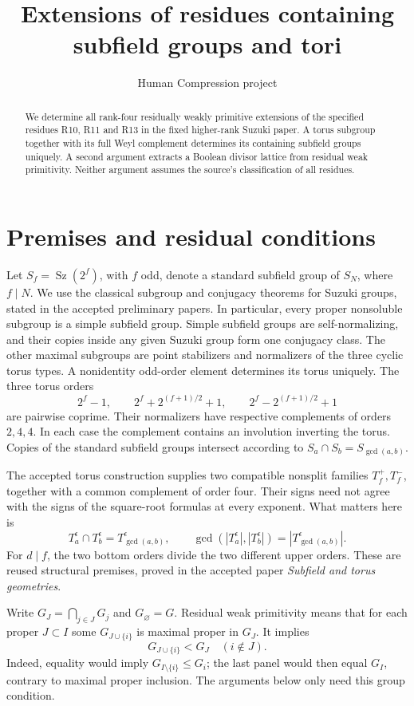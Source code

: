 \documentclass[11pt,a4paper]{article}
\title{Extensions of residues containing subfield groups and tori}
\author{Human Compression project}\date{}
\newcommand{\Sz}{\operatorname{Sz}}\newcommand{\F}{\mathbb F}
\begin{document}
\maketitle
\begin{abstract}
We determine all rank-four residually weakly primitive extensions of
the specified residues R10, R11 and R13 in the fixed higher-rank Suzuki
paper. A torus subgroup together with its full Weyl complement determines
its containing subfield groups uniquely. A second argument extracts a
Boolean divisor lattice from residual weak primitivity. Neither argument
assumes the source's classification of all residues.
\end{abstract}

\section{Premises and residual conditions}
Let $S_f=\Sz(2^f)$, with $f$ odd, denote a standard subfield group of
$S_N$, where $f\mid N$. We use the classical subgroup and conjugacy
theorems for Suzuki groups, stated in the accepted preliminary papers.
In particular, every proper nonsoluble subgroup is a simple subfield
group. Simple subfield groups are self-normalizing, and their copies
inside any given Suzuki group form one conjugacy class. The other
maximal subgroups are point stabilizers and normalizers of the three
cyclic torus types. A nonidentity odd-order element determines its
torus uniquely. The three torus orders
\[
 2^f-1,\qquad 2^f+2^{(f+1)/2}+1,\qquad
 2^f-2^{(f+1)/2}+1
\]
are pairwise coprime. Their normalizers have respective complements
of orders $2,4,4$. In each case the complement contains an involution
inverting the torus. Copies of the standard subfield groups intersect
according to $S_a\cap S_b=S_{\gcd(a,b)}$.

The accepted torus construction supplies two compatible nonsplit
families $T_f^+,T_f^-$, together with a common complement of order four.
Their signs need not agree with the signs of the square-root formulas
at every exponent. What matters here is
\[
 T_a^\epsilon\cap T_b^\epsilon=T_{\gcd(a,b)}^\epsilon,
 \qquad
 \gcd(|T_a^\epsilon|,|T_b^\epsilon|)
       =|T_{\gcd(a,b)}^\epsilon|.                 \tag{1}
\]
For $d\mid f$, the two bottom orders divide the two different upper
orders. These are reused structural premises, proved in the accepted
paper \emph{Subfield and torus geometries}.

Write $G_J=\bigcap_{j\in J}G_j$ and $G_\varnothing=G$.
Residual weak primitivity means that for each proper $J\subset I$
some $G_{J\cup\{i\}}$ is maximal proper in $G_J$. It implies
\[
 G_{J\cup\{i\}}<G_J\quad(i\notin J).           \tag{2}
\]
Indeed, equality would imply $G_{I\setminus\{i\}}\le G_i$;
the last panel would then equal $G_I$, contrary to maximal proper
inclusion. The arguments below only need this group condition.
\end{document}
